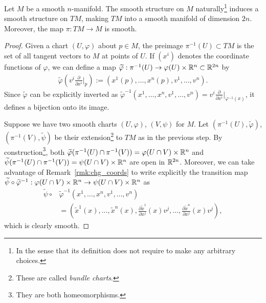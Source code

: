 \begin{theorem}\label{thm:tgbdlsmoothmfld}
  Let $M$ be a smooth $n$-manifold.
  The smooth structure on $M$ naturally\footnote{In the sense that its definition does not require to make any arbitrary choices.} induces a smooth structure on $TM$, making $TM$ into a smooth manifold of dimension $2n$.
  Moreover, the map $\pi: TM \to M$ is smooth.
\end{theorem}
\begin{proof}
  Given a chart $(U,\varphi)$ about $p\in M$, the preimage $\pi^{-1}(U) \subset TM$ is the set of all tangent vectors to $M$ at points of $U$.
  If $(x^i)$ denotes the coordinate functions of $\varphi$, we can define a map $\widetilde\varphi : \pi^{-1}(U) \to \varphi(U)\times\mathbb{R}^n \subset \mathbb{R}^{2n}$ by
  \begin{align}\label{eq:nat_coords}
    \widetilde\varphi\left(v^i \frac{\partial}{\partial x^i}\Big|_p\right) := \left(x^1(p), \ldots, x^n(p), v^1, \ldots, v^n\right).
  \end{align}
  Since $\widetilde\varphi$ can be explicitly inverted as $\widetilde\varphi^{-1}\left(x^1, \ldots, x^n, v^1, \ldots, v^n\right) = v^i \frac{\partial}{\partial x^i}\Big|_{\varphi^{-1}(x)}$, it defines a bijection onto its image.

  Suppose we have two smooth charts $(U,\varphi)$, $(V,\psi)$ for $M$.
  Let $(\pi^{-1}(U),\widetilde\varphi)$, $(\pi^{-1}(V),\widetilde\psi)$ be their extension\footnote{These are called \emph{bundle charts}.} to $TM$ as in the previous step.
  By construction\footnote{They are both homeomorphisms.}, both $\widetilde\varphi(\pi^{-1}(U)\cap\pi^{-1}(V)) = \varphi(U\cap V)\times\mathbb{R}^n$ and $\widetilde\psi(\pi^{-1}(U)\cap\pi^{-1}(V)) = \psi(U\cap V)\times\mathbb{R}^n$ are open in $\mathbb{R}^{2n}$.
  Moreover, we can take advantage of Remark~\ref{rmk:chg_coords} to write explicitly the transition map  $\widetilde\psi\circ\widetilde\varphi^{-1}: \varphi(U\cap V)\times\mathbb{R}^n \to \psi(U\cap V)\times\mathbb{R}^n$ as
  \begin{align}
    \widetilde\psi\circ&\widetilde\varphi^{-1}\left(x^1, \ldots, x^n, v^1, \ldots, v^n\right) \\
    &=\left(\widetilde x^1(x),\ldots, \widetilde x^n(x), \frac{\partial \widetilde x^1}{\partial x^j}(x) v^j, \ldots, \frac{\partial \widetilde x^n}{\partial x^j}(x) v^j\right),
  \end{align}
  which is clearly smooth.


\end{proof}

